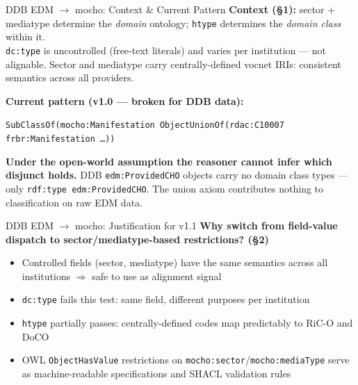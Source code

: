 \documentclass[xcolor,aspectratio=169,compress]{beamer}
\begin{document}
\begin{frame}{DDB EDM $\to$ mocho: Context \& Current Pattern}
  \small
  \textbf{Context (§1):} sector + mediatype determine the \emph{domain} ontology;
  \texttt{htype} determines the \emph{domain class} within it. \\
  \texttt{dc:type} is uncontrolled (free-text literals) and varies per institution
  --- not alignable. Sector and mediatype carry centrally-defined vocnet IRIs:
  consistent semantics across all providers.

  \smallskip
  \textbf{Current pattern (v1.0 --- broken for DDB data):}
  \begin{center}
  \footnotesize
  \texttt{SubClassOf(mocho:Manifestation ObjectUnionOf(rdac:C10007 frbr:Manifestation \ldots))}
  \end{center}
  \vspace{-4pt}
  \textbf{Under the open-world assumption the reasoner cannot infer which disjunct holds.}
  DDB \texttt{edm:ProvidedCHO} objects carry no domain class types --- only \texttt{rdf:type edm:ProvidedCHO}.
  The union axiom contributes nothing to classification on raw EDM data.
\end{frame}

\begin{frame}{DDB EDM $\to$ mocho: Justification for v1.1}
  \small
  \textbf{Why switch from field-value dispatch to sector/mediatype-based restrictions? (§2)}
  \begin{itemize}\setlength{\itemsep}{4pt}
    \item Controlled fields (sector, mediatype) have the same semantics across all institutions
      $\Rightarrow$ safe to use as alignment signal
    \item \texttt{dc:type} fails this test: same field, different purposes per institution
    \item \texttt{htype} partially passes: centrally-defined codes map predictably to RiC-O and DoCO
    \item OWL \texttt{ObjectHasValue} restrictions on \texttt{mocho:sector}/\texttt{mocho:mediaType}
      serve as machine-readable specifications and SHACL validation rules
  \end{itemize}
\end{frame}
\end{document}
